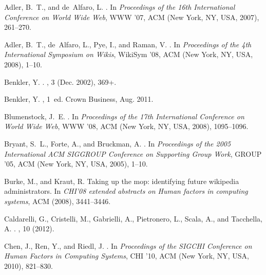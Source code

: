 \begin{thebibliography}{10}

Adler, B.~T., and de~Alfaro, L.
.
\newblock In {\em Proceedings of the 16th International Conference on World
  Wide Web}, WWW '07, ACM (New York, NY, USA, 2007), 261--270.

Adler, B.~T., de~Alfaro, L., Pye, I., and Raman, V.
.
\newblock In {\em Proceedings of the 4th International Symposium on Wikis},
  WikiSym '08, ACM (New York, NY, USA, 2008), 1--10.

Benkler, Y.
.
, 3 (Dec. 2002), 369+.

Benkler, Y.
, 1~ed.
\newblock Crown Business, Aug. 2011.

Blumenstock, J.~E.
.
\newblock In {\em Proceedings of the 17th International Conference on World
  Wide Web}, WWW '08, ACM (New York, NY, USA, 2008), 1095--1096.

Bryant, S.~L., Forte, A., and Bruckman, A.
.
\newblock In {\em Proceedings of the 2005 International ACM SIGGROUP Conference
  on Supporting Group Work}, GROUP '05, ACM (New York, NY, USA, 2005), 1--10.

Burke, M., and Kraut, R.
\newblock Taking up the mop: identifying future wikipedia administrators.
\newblock In {\em CHI'08 extended abstracts on Human factors in computing
  systems}, ACM (2008), 3441--3446.

Caldarelli, G., Cristelli, M., Gabrielli, A., Pietronero, L., Scala, A., and
  Tacchella, A.
.
, 10 (2012).

Chen, J., Ren, Y., and Riedl, J.
.
\newblock In {\em Proceedings of the SIGCHI Conference on Human Factors in
  Computing Systems}, CHI '10, ACM (New York, NY, USA, 2010), 821--830.


\end{thebibliography}
